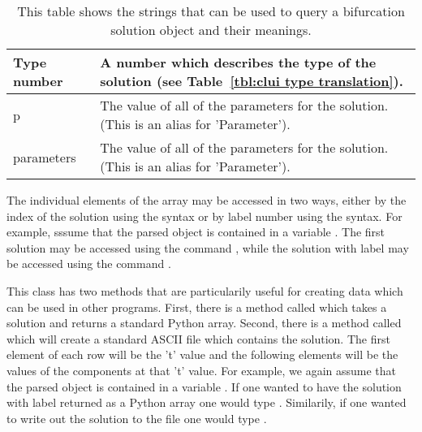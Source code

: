 \begin{table}[htbp]
\begin{center}
\begin{tabular}{| l | l |}
\hline
Type number & \begin{minipage}{4in} \smallskip A number which describes the type of the solution (see Table~\ref{tbl:clui type translation}).  \smallskip \end{minipage} \\  
\hline
p & \begin{minipage}{4in} \smallskip The value of all of the parameters for the solution. (This is an alias for 'Parameter'). \smallskip \end{minipage} \\  
\hline
parameters & \begin{minipage}{4in} \smallskip The value of all of the parameters for the solution. (This is an alias for 'Parameter').\smallskip \end{minipage} \\  
\hline
\end{tabular}
\caption[Contents of a bifurcation solution object.]
{This table shows the strings that can be used to
query a bifurcation solution object and their
meanings.}
\label{tbl:clui parse solution}
\end{center}
\end{table}

The individual elements of the array may be accessed 
in two ways, either by the index of the solution using the
\commandf{[]} syntax or by label number using the
\commandf{()} syntax.  For example, sssume that the parsed object is contained
in a variable .  
The first solution may be accessed 
using the command , while the solution with
label  may be accessed using the command .

This class has two methods that are particularily useful
for creating data which can be used in other programs.
First, there is a method called  which
takes a solution and returns a standard Python array.
Second, there is a method called 
which will create a standard ASCII file which contains
the solution.  The first element of each row will be
the 't' value and the following elements will be the
values of the components at that 't' value.
For example, we again assume that the parsed object is contained
in a variable .  If one wanted to have the
solution with label  returned as a Python
array one would type .
Similarily, if one wanted to write out the solution
to the file  one would type
.

